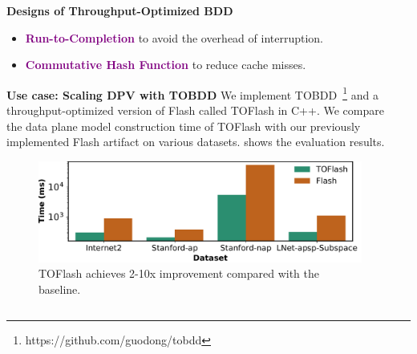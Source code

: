 \documentclass[final]{beamer}
\newcommand{\system}{TOBDD\xspace}
\newcommand{\efsz}[1]{\textcolor{purple}{\textbf{#1}}}
\newlength{\sepwidthB}
\newlength{\colwidthB}
\newcommand{\separatorcolumnB}{\begin{column}{\sepwidthB}\end{column}}
\begin{document}
\begin{frame}[t]
\begin{columns}
\begin{column}[T]{\colwidthB}
\begin{block}{\Large{\textbf{Designs of Throughput-Optimized BDD}}}
\begin{itemize}
    \item {\efsz{Run-to-Completion} to avoid the overhead of interruption.}

    \item {\efsz{Commutative Hash Function} to reduce cache misses.}

  \end{itemize}
\end{block}

\vspace{-0.5cm}
\begin{block}{\Large{\textbf{Use case: Scaling DPV with TOBDD}}}
\vspace{0.9cm}
\large
We implement \system~\footnote{https://github.com/guodong/tobdd} and 
a throughput-optimized version of Flash called TOFlash in C++. 
We compare the data plane model construction time of TOFlash with 
our previously implemented Flash artifact on various datasets.
 shows the evaluation results.
\end{block}

\begin{figure}
\centering
\includegraphics[width=1\textwidth]{figures/toflash.pdf}
\caption{TOFlash achieves 2-10x improvement compared with the baseline.}
\label{fig:eval}
\end{figure}

\end{column}
\separatorcolumnB
\end{columns}




\end{frame}
\end{document}
